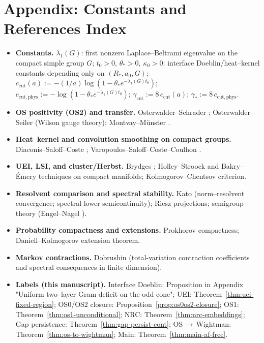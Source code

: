 \documentclass[11pt]{amsart}
\theoremstyle{plain}
\theoremstyle{definition}
\theoremstyle{remark}
\begin{document}
\section*{Appendix: Constants and References Index}
\begin{itemize}
  \item \textbf{Constants.} $\lambda_1(G)$: first nonzero Laplace--Beltrami eigenvalue on the compact simple group $G$; $t_0>0$, $\theta_*>0$, $\kappa_0>0$: interface Doeblin/heat--kernel constants depending only on $(R_*,a_0,G)$; $c_{\mathrm{cut}}(a):=-(1/a)\log(1-\theta_* e^{-\lambda_1(G) t_0})$; $c_{\mathrm{cut,phys}}:= -\log(1-\theta_* e^{-\lambda_1(G) t_0})$; $\gamma_{\mathrm{cut}}:=8\,c_{\mathrm{cut}}(a)$; $\gamma_*:=8\,c_{\mathrm{cut,phys}}$.
  \item \textbf{OS positivity (OS2) and transfer.} Osterwalder--Schrader \cite{Osterwalder1973,Osterwalder1975}; Osterwalder--Seiler \cite{OsterwalderSeiler1978} (Wilson gauge theory); Montvay--M\"unster \cite{MontvayMunster1994}.
\item \textbf{Heat--kernel and convolution smoothing on compact groups.} Diaconis--Saloff--Coste \cite{DiaconisSaloffCoste2004}; Varopoulos--Saloff--Coste--Coulhon \cite{VaropoulosSaloffCosteCoulhon1992}.
  \item \textbf{UEI, LSI, and cluster/Herbst.} Brydges \cite{Brydges1978,Brydges1986}; Holley--Stroock and Bakry--\'Emery techniques on compact manifolds; Kolmogorov--Chentsov criterion.
  \item \textbf{Resolvent comparison and spectral stability.} Kato \cite{Kato1995} (norm--resolvent convergence; spectral lower semicontinuity); Riesz projections; semigroup theory (Engel--Nagel \cite{EngelNagel2000}).
  \item \textbf{Probability compactness and extensions.} Prokhorov compactness; Daniell--Kolmogorov extension theorem.
  \item \textbf{Markov contractions.} Dobrushin \cite{Dobrushin1970} (total-variation contraction coefficients and spectral consequences in finite dimension).
\item \textbf{Labels (this manuscript).} Interface Doeblin: Proposition in Appendix "Uniform two--layer Gram deficit on the odd cone"; UEI: Theorem~\ref{thm:uei-fixed-region}; OS0/OS2 closure: Proposition~\ref{prop:os0os2-closure}; OS1: Theorem~\ref{thm:os1-unconditional}; NRC: Theorem~\ref{thm:nrc-embeddings}; Gap persistence: Theorem~\ref{thm:gap-persist-cont}; OS\,$\to$\,Wightman: Theorem~\ref{thm:os-to-wightman}; Main: Theorem~\ref{thm:main-af-free}.
\end{itemize}
\end{document}
